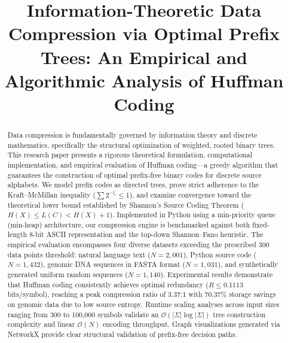 \documentclass[conference]{IEEEtran}
\begin{document}
\title{Information-Theoretic Data Compression via Optimal Prefix Trees: An Empirical and Algorithmic Analysis of Huffman Coding}

\author{
}

\maketitle

\begin{abstract}
Data compression is fundamentally governed by information theory and discrete mathematics, specifically the structural optimization of weighted, rooted binary trees. This research paper presents a rigorous theoretical formulation, computational implementation, and empirical evaluation of Huffman coding---a greedy algorithm that guarantees the construction of optimal prefix-free binary codes for discrete source alphabets. We model prefix codes as directed trees, prove strict adherence to the Kraft--McMillan inequality ($\sum 2^{-l_i} \le 1$), and examine convergence toward the theoretical lower bound established by Shannon's Source Coding Theorem ($H(X) \le L(C) < H(X) + 1$). Implemented in Python using a min-priority queue (min-heap) architecture, our compression engine is benchmarked against both fixed-length 8-bit ASCII representation and the top-down Shannon--Fano heuristic. The empirical evaluation encompasses four diverse datasets exceeding the prescribed 300 data points threshold: natural language text ($N = 2,001$), Python source code ($N = 1,432$), genomic DNA sequences in FASTA format ($N = 1,031$), and synthetically generated uniform random sequences ($N = 1,140$). Experimental results demonstrate that Huffman coding consistently achieves optimal redundancy ($R \le 0.1113$ bits/symbol), reaching a peak compression ratio of 3.37:1 with 70.37\% storage savings on genomic data due to low source entropy. Runtime scaling analyses across input sizes ranging from 300 to 100,000 symbols validate an $\mathcal{O}(|\Sigma| \log |\Sigma|)$ tree construction complexity and linear $\mathcal{O}(N)$ encoding throughput. Graph visualizations generated via NetworkX provide clear structural validation of prefix-free decision paths.
\end{abstract}
\end{document}
